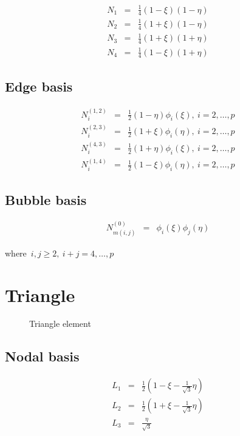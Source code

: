 \begin{eqnarray*}
N_1&=&\frac{1}{4}(1-\xi)(1-\eta) \\
N_2&=&\frac{1}{4}(1+\xi)(1-\eta) \\
N_3&=&\frac{1}{4}(1+\xi)(1+\eta) \\
N_4&=&\frac{1}{4}(1-\xi)(1+\eta)
\end{eqnarray*}

\subsection{Edge basis}

\begin{eqnarray*}
N_i^{(1,2)}&=&\frac{1}{2}(1-\eta)\phi_i(\xi), \ i=2,\ldots,p \\
N_i^{(2,3)}&=&\frac{1}{2}(1+\xi)\phi_i(\eta), \ i=2,\ldots,p \\
N_i^{(4,3)}&=&\frac{1}{2}(1+\eta)\phi_i(\xi), \ i=2,\ldots,p \\ 
N_i^{(1,4)}&=&\frac{1}{2}(1-\xi)\phi_i(\eta), \ i=2,\ldots,p
\end{eqnarray*} 

\subsection{Bubble basis}

\begin{eqnarray*}
N_{m(i,j)}^{(0)}&=&\phi_i(\xi)\phi_j(\eta)
\end{eqnarray*}

\noindent where\ $i,j\geq 2,\ i+j=4,\ldots,p$

\section{Triangle}

\begin{figure}[tbhp]
\begin{center}

\caption{Triangle element}
\end{center}
\end{figure}

\subsection{Nodal basis}

\begin{eqnarray*}
L_1&=&\frac{1}{2}(1-\xi-\frac{1}{\sqrt{3}}\eta) \\
L_2&=&\frac{1}{2}(1+\xi-\frac{1}{\sqrt{3}}\eta) \\
L_3&=&\frac{\eta}{\sqrt{3}}
\end{eqnarray*}

